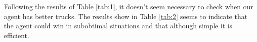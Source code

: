 \documentclass[11pt]{article}
\begin{document}
Following the results of Table \ref{tab:1}, it doesn't seem necessary to check when our agent has better trucks. The results show in Table \ref{tab:2} seems to indicate that the agent could win in subobtimal situations and that although simple it is efficient.



\end{document}
